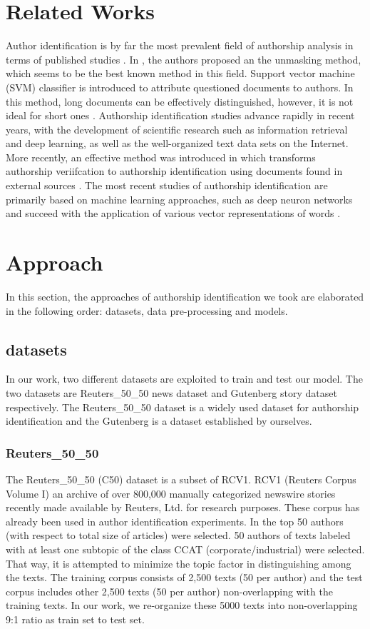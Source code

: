 \documentclass{article} %
\begin{document}
\section{Related Works}
Author identification is by far the most prevalent field of authorship analysis in terms of published studies \cite{pan2014}. In \cite{best_known}, the authors proposed an the unmasking method, which seems to be the best known method in this field. Support vector machine (SVM) classifier is introduced to attribute questioned documents to authors. In this method, long documents can be effectively distinguished, however, it is not ideal for short ones \cite{shortcoming}. Authorship identification studies advance rapidly in recent years, with the development of scientific research such as information retrieval and deep learning, as well as the well-organized text data sets on the Internet. More recently, an effective method was introduced in \cite{Koppel} which transforms authorship veriifcation to authorship identification using documents found in external sources \cite{pan2014}. The most recent studies of authorship identification are primarily based on machine learning approaches, such as deep neuron networks and succeed with the application of various vector representations of words \cite{Rhodes}.



\section{Approach}
In this section, the approaches of authorship identification we took are elaborated in the following order: datasets, data pre-processing and models.
\subsection{datasets}
In our work, two different datasets are exploited to train and test our model. The two datasets are Reuters\_50\_50 news dataset and Gutenberg story dataset respectively. The Reuters\_50\_50 dataset is a widely used dataset for authorship identification and the Gutenberg is a dataset established by ourselves.
\subsubsection{Reuters\_50\_50}
The Reuters\_50\_50 (C50) dataset is a subset of RCV1. RCV1 (Reuters Corpus Volume I) an archive of over 800,000 manually categorized newswire stories recently made available by Reuters, Ltd. for research purposes. \cite{RCV} These corpus has already been used in author identification experiments. In the top 50 authors (with respect to total size of articles) were selected. 50 authors of texts labeled with at least one subtopic of the class CCAT (corporate/industrial) were selected. That way, it is attempted to minimize the topic factor in distinguishing among the texts. The training corpus consists of 2,500 texts (50 per author) and the test corpus includes other 2,500 texts (50 per author) non-overlapping with the training texts.\cite{Reuter} In our work, we re-organize these 5000 texts into non-overlapping 9:1 ratio as train set to test set.
\end{document}
